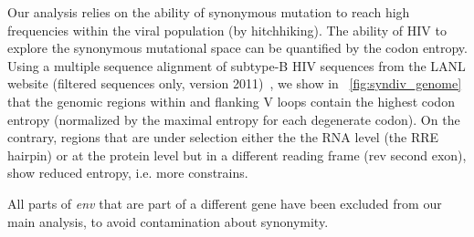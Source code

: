 \documentclass[rmp]{revtex4}
\begin{document}
Our analysis relies on the ability of synonymous mutation to reach high
frequencies within the viral population (by hitchhiking). The ability of HIV to
explore the synonymous mutational space can be quantified by the codon entropy.
Using a multiple sequence alignment of subtype-B HIV sequences from the LANL
website (filtered sequences only, version 2011)~\cite{LANL2012}, we show in
\figurename~\ref{fig:syndiv_genome} that the genomic regions within and flanking
V loops contain the highest codon entropy (normalized by the maximal entropy for
each degenerate codon). On the contrary, regions that are under selection either
the the RNA level (the RRE hairpin) or at the protein level but in a different
reading frame (rev second exon), show reduced entropy, i.e. more constrains.

All parts of {\it env} that are part of a different gene have been excluded from
our main analysis, to avoid contamination about synonymity.

\end{document}
